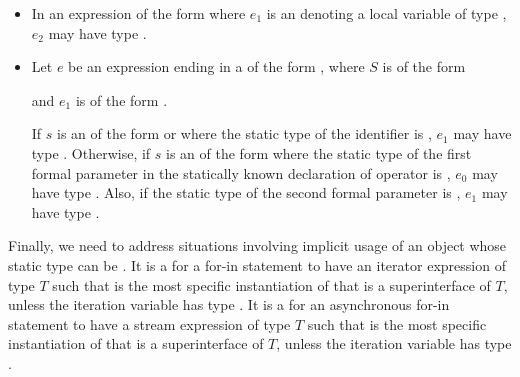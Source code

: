 \documentclass[makeidx]{article}
\begin{document}
{\begin{itemize}
  In a  $F$ of the form
  , $e$ can have
  element type, key type, or value type \VOID{}.

\item
  In an expression of the form 
  where $e_1$ is an  denoting a local variable
  of type \VOID,
  $e_2$ may have type \VOID.
\item
  Let $e$ be an expression ending in a 
  of the form ,
  where $S$ is of the form

  \noindent

  \noindent
  and $e_1$ is of the form .

  If $s$ is an  of the
  form  or 
  where the static type of the identifier \id{} is \VOID,
  $e_1$ may have type \VOID.
  Otherwise, if $s$ is an  of the form
  \code{[$\,e_0\,$]} where the static type of
  the first formal parameter in the statically known declaration
  of operator \code{[]=} is \VOID,
  $e_0$ may have type \VOID.
  Also, if the static type of the second formal parameter is \VOID,
  $e_1$ may have type \VOID.
\end{itemize}

\LMHash{}%
Finally, we need to address situations involving implicit usage of
an object whose static type can be \VOID.
%
It is a  for a for-in statement to have an iterator
expression of type $T$ such that 
is the most specific instantiation of 
that is a superinterface of $T$, unless the
iteration variable has type \VOID.
%
It is a  for an asynchronous for-in statement
to have a stream expression of type $T$
such that  is the most specific
instantiation of  that is a superinterface of $T$,
unless the iteration variable has type \VOID.

}
\end{document}
